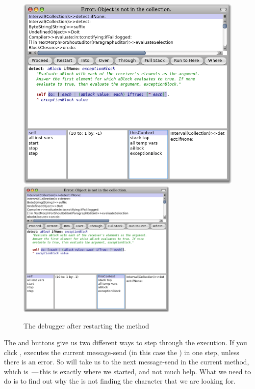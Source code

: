 \documentclass[a4paper,10pt,twoside]{book}
\begin{document}
\begin{figure}[btp]
	\begin{center}
	\ifluluelse
		{\includegraphics[width=\textwidth]{RestartDetectIfNone}}
		{\includegraphics[width=0.7\textwidth]{RestartDetectIfNone}}
	\end{center}
	\caption{The debugger after restarting the  method}
\end{figure}

The  and  buttons give us two different ways to step through the execution.  If you click , \pharo executes the current message-send (in this case the ) in one step, unless there is an error.  
So  will take us to the next message-send in the current method, which is \,---\,this is exactly where we started, and not much help. 
What we need to do is to find out why the  is not finding the character that we are looking for.
\end{document}
